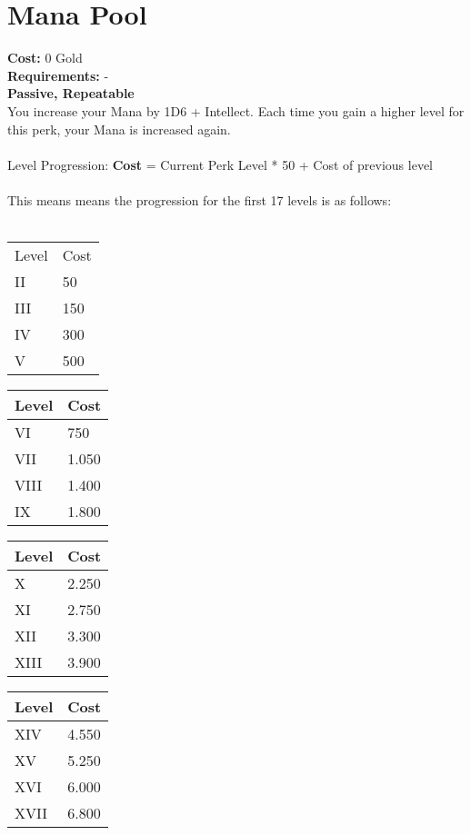 \section*{Mana Pool}\label{sec:manapool}
\textbf{Cost:} 0 Gold\\
\textbf{Requirements:} -\\
\textbf{Passive, Repeatable}\\
You increase your Mana by 1D6 + Intellect.
Each time you gain a higher level for this perk, your Mana is increased again.\\
\\
Level Progression: \textbf{Cost} = Current Perk Level * 50 + Cost of previous level\\
\\
This means means the progression for the first 17 levels is as follows:\\
\\
\begin{minipage}{0.25\textwidth}
    \begin{tabular}{l | l}
        Level & Cost\\
        II & 50\\
        III & 150\\
        IV & 300\\
        V & 500\\
    \end{tabular}
\end{minipage}
\begin{minipage}{0.25\textwidth}
    \begin{tabular}{l | l}
        Level & Cost\\ \hline
        VI & 750\\
        VII & 1.050\\
        VIII & 1.400\\
        IX & 1.800\\
    \end{tabular}
\end{minipage}
\begin{minipage}{0.25\textwidth}
    \begin{tabular}{l | l}
        Level & Cost\\ \hline
        X & 2.250\\
        XI & 2.750\\
        XII & 3.300\\
        XIII & 3.900\\
    \end{tabular}
\end{minipage}
\begin{minipage}{0.25\textwidth}
    \begin{tabular}{l | l}
        Level & Cost\\ \hline
        XIV & 4.550\\
        XV & 5.250\\
        XVI & 6.000\\
        XVII & 6.800\\
    \end{tabular}
\end{minipage}